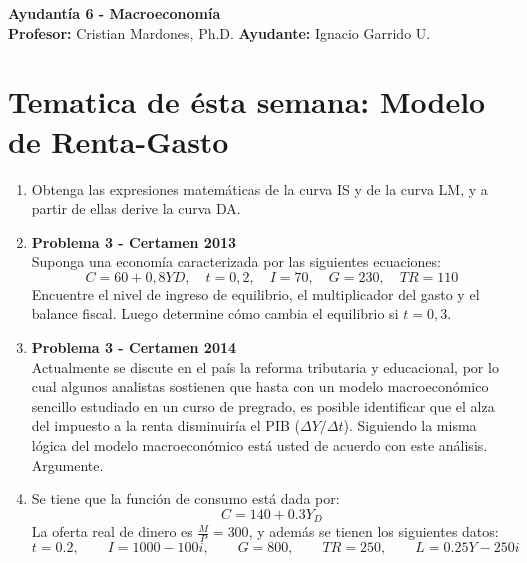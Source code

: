 \documentclass[11pt,addpoints]{article}
\begin{document}
\vspace*{0.01cm}

\begin{center}
{\Large \bfseries Ayudantía 6 - Macroeconomía \\[0.5cm]}
\textbf{Profesor:} Cristian Mardones, Ph.D. \quad \textbf{Ayudante:} Ignacio Garrido U.
\end{center}

\section*{\textbf{Tematica de ésta semana: Modelo de Renta-Gasto}}
\begin{enumerate}

\item 
Obtenga las expresiones matemáticas de la curva IS y de la curva LM, y a partir de ellas derive la curva DA.

\item \textbf{Problema 3 - Certamen 2013}\\[0.1cm]
Suponga una economía caracterizada por las siguientes ecuaciones:
\[
C = 60 + 0{,}8YD, \quad t = 0{,}2, \quad I = 70, \quad G = 230, \quad TR = 110
\]
Encuentre el nivel de ingreso de equilibrio, el multiplicador del gasto y el balance fiscal.  
Luego determine cómo cambia el equilibrio si \( t = 0{,}3 \).
 



\item \textbf{Problema 3 - Certamen 2014}\\[0.1cm]
Actualmente se discute en el país la reforma tributaria y educacional, por lo cual algunos analistas sostienen que hasta con un modelo macroeconómico sencillo estudiado en un curso de pregrado, es posible identificar que el alza del impuesto a la renta disminuiría el PIB (\( \Delta Y/\Delta t \)). Siguiendo la misma lógica del modelo macroeconómico está usted de acuerdo con este análisis. Argumente.

\item Se tiene que la función de consumo está dada por:
\[
C = 140 + 0.3Y_D
\]
La oferta real de dinero es \( \tfrac{M}{P} = 300 \), y además se tienen los siguientes datos:
\[
t = 0.2, \qquad I = 1000 - 100i, \qquad G = 800, \qquad TR = 250, \qquad L = 0.25Y - 250i
\]


\end{enumerate}
\end{document}
